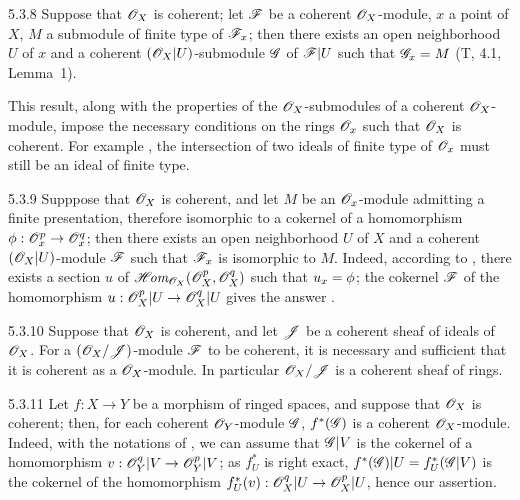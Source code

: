 \begin{env}{5.3.8}
\label{env-0.5.3.8}
Suppose that $\mathscr{O}_X$ is coherent; let $\mathscr{F}$ be a coherent $\mathscr{O}_X$-module, $x$ a point of
$X$, $M$ a submodule of finite type of $\mathscr{F}_x$; then there exists an open neighborhood $U$
of $x$ and a coherent $(\mathscr{O}_X|U)$-submodule $\mathscr{G}$ of $\mathscr{F}|U$ such that $\mathscr{G}_x=M$
(T, 4.1, Lemma~1).

This result, along with the properties of the $\mathscr{O}_X$-submodules of a coherent
$\mathscr{O}_X$-module, impose the necessary conditions on the rings $\mathscr{O}_x$ such that $\mathscr{O}_X$ is
coherent. For example , the intersection of two ideals of finite type of
$\mathscr{O}_x$ must still be an ideal of finite type.
\end{env}

\begin{env}{5.3.9}
\label{env-0.5.3.9}
Supppose that $\mathscr{O}_X$ is coherent, and let $M$ be an $\mathscr{O}_x$-module admitting a finite
presentation, therefore isomorphic to a cokernel of a homomorphism $\phi:\mathscr{O}_x^p\to\mathscr{O}_x^q$;
then there exists an open neighborhood $U$ of $X$ and a coherent $(\mathscr{O}_X|U)$-module $\mathscr{F}$
such that $\mathscr{F}_x$ is isomorphic to $M$. Indeed, according to , there
exists a section $u$ of $\mathscr{H}\!\textit{om}_{\mathscr{O}_X}(\mathscr{O}_X^p,\mathscr{O}_X^q)$ such that $u_x=\phi$; the cokernel
$\mathscr{F}$ of the homomorphism $u:\mathscr{O}_X^p|U\to\mathscr{O}_X^q|U$ gives the answer .
\end{env}

\begin{env}{5.3.10}
\label{env-0.5.3.10}
Suppose that $\mathscr{O}_X$ is coherent, and let $\mathscr{J}$ be a coherent sheaf of ideals of $\mathscr{O}_X$.
For a $(\mathscr{O}_X/\mathscr{J})$-module $\mathscr{F}$ to be coherent, it is necessary and sufficient that it
is coherent as a $\mathscr{O}_X$-module. In particular $\mathscr{O}_X/\mathscr{J}$ is a coherent sheaf of rings.
\end{env}

\begin{env}{5.3.11}
\label{env-0.5.3.11}
Let $f:X\to Y$ be a morphism of ringed spaces, and suppose that $\mathscr{O}_X$ is coherent; then,
for each coherent $\mathscr{O}_Y$-module $\mathscr{G}$, $f^*(\mathscr{G})$ is a coherent $\mathscr{O}_X$-module.
Indeed, with the notations of , we can assume that $\mathscr{G}|V$ is the
cokernel of a homomorphism $v:\mathscr{O}_Y^q|V\to\mathscr{O}_Y^p|V$; as $f_U^*$ is right exact,
$f^*(\mathscr{G})|U=f_U^*(\mathscr{G}|V)$ is the cokernel of the homomorphism
$f_U^*(v):\mathscr{O}_X^q|U\to\mathscr{O}_X^p|U$, hence our assertion.
\end{env}

